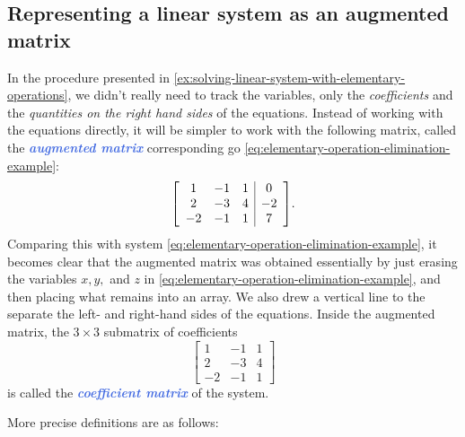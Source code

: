 \documentclass[10pt]{article}
\newcommand{\demph}[1]{\textcolor{RoyalBlue}{\textbf{\slshape #1}}} %
\newenvironment{augmentedmatrix}[1] %
{\left[\begin{array}{#1}}
    {\end{array}\right]}
\theoremstyle{definition}
\begin{document}
\subsection{Representing a linear system as an augmented matrix}
In the procedure presented in
\cref{ex:solving-linear-system-with-elementary-operations}, we didn't really
need to track the variables, only the \textit{coefficients} and the
\textit{quantities on the right hand sides} of the equations. Instead of
working with the equations directly, it will be simpler to work with the
following matrix, called the \demph{augmented matrix} corresponding go
\cref{eq:elementary-operation-elimination-example}:
\begin{equation*}
  \begin{augmentedmatrix}{ccc|c}
    1& -1& 1& 0 \\
    2& -3& 4& -2 \\
    -2& -1& 1& 7
  \end{augmentedmatrix}.
\end{equation*}
Comparing this with system \eqref{eq:elementary-operation-elimination-example}, it becomes
clear that the augmented matrix was obtained essentially by just erasing the
variables $x,y,$ and $z$ in \eqref{eq:elementary-operation-elimination-example}, and
then placing what remains into an array. We also drew a vertical line to the
separate the left- and right-hand sides of the equations. Inside the augmented
matrix, the $3\times 3$ submatrix  of coefficients
\begin{equation*}
  \begin{bmatrix}
    1& -1& 1\\
    2& -3& 4\\
    -2& -1& 1
  \end{bmatrix}
\end{equation*}
is called the \demph{coefficient matrix} of the system. 

More precise definitions are as follows:
\end{document}
